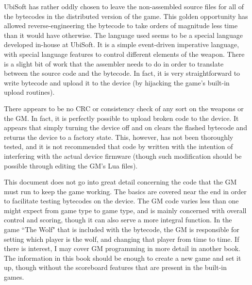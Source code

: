 \documentclass[12pt,a4paper]{scrbook}
\begin{document}
UbiSoft has rather oddly chosen to leave the non-assembled source files for all of the
bytecodes in the distributed version of the game.  This golden opportunity has allowed
reverse-engineering the bytecode to take orders of magnitude less time than it would
have otherwise.  The language used seems to be a special language developed in-house at
UbiSoft.  It is a simple event-driven imperative language, with special language features to control
different elements of the weapon.  There is a slight bit of work that the assembler needs 
to do in order to translate between the source code and the bytecode.  In fact, it is very
straightforward to write bytecode and upload it to the device (by hijacking the game's built-in
upload routines).

There appears to be no CRC or consistency check of any sort on the weapons or the GM.  In fact,
it is perfectly possible to upload broken code to the device.  It appears that simply turning
the device off and on clears the flashed bytecode and returns the device to a factory state.
This, however, has not been thoroughly tested, and it is not recommended that code by written
with the intention of interfering with the actual device firmware (though such modification 
should be possible through editing the GM's Lua files).


This document does not go into great detail concerning the code that the GM must run to keep the
game working.  The basics are covered near the end in order to facilitate testing bytecodes on
the device.  The GM code varies less than one might expect from game type to game type, and is
mainly concerned with overall control and scoring, though it can also serve a more integral function.
In the game ``The Wolf" that is included with the bytecode, the GM is responsible for setting which
player is the wolf, and changing that player from time to time.  If there is interest, I may cover
GM programming in more detail in another book.  The information in this book should be enough to
create a new game and set it up, though without the scoreboard features that are present in the
built-in games.
 
\end{document}
